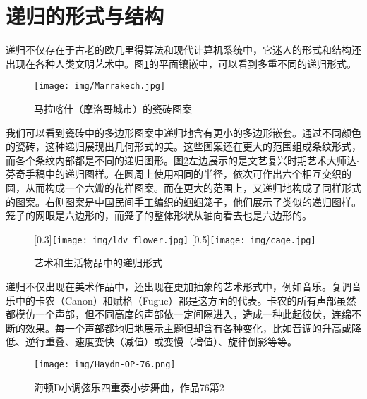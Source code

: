 \documentclass[UTF8]{article}
\begin{document}
\section{递归的形式与结构}

递归不仅存在于古老的欧几里得算法和现代计算机系统中，它迷人的形式和结构还出现在各种人类文明艺术中。图\ref{fig:Ceramic-Tile-Tessellations-Marrakech}的平面镶嵌中，可以看到多重不同的递归形式。

\begin{figure}[htbp]
 \centering
 \texttt{[image: img/Marrakech.jpg]}
 \caption{马拉喀什（摩洛哥城市）的瓷砖图案}
 \label{fig:Ceramic-Tile-Tessellations-Marrakech}
\end{figure}

我们可以看到瓷砖中的多边形图案中递归地含有更小的多边形嵌套。通过不同颜色的瓷砖，这种递归展现出几何形式的美。这些图案还在更大的范围组成条纹形式，而各个条纹内部都是不同的递归图形。图\ref{fig:flower}左边展示的是文艺复兴时期艺术大师达$\cdot$芬奇手稿中的递归图样。在圆周上使用相同的半径，依次可作出六个相互交织的圆，从而构成一个六瓣的花样图案。而在更大的范围上，又递归地构成了同样形式的图案。右侧图案是中国民间手工编织的蝈蝈笼子，他们展示了类似的递归图样。笼子的网眼是六边形的，而笼子的整体形状从轴向看去也是六边形的。

\begin{figure}[htbp]
 \centering
 [0.3\linewidth]{\texttt{[image: img/ldv\_flower.jpg]}} \quad
 [0.5\linewidth]{\texttt{[image: img/cage.jpg]}}
 \caption{艺术和生活物品中的递归形式}
 \label{fig:flower}
\end{figure}

递归不仅出现在美术作品中，还出现在更加抽象的艺术形式中，例如音乐。复调音乐中的卡农（Canon）和赋格（Fugue）都是这方面的代表。卡农的所有声部虽然都模仿一个声部，但不同高度的声部依一定间隔进入，造成一种此起彼伏，连绵不断的效果。每一个声部都地归地展示主题但却含有各种变化，比如音调的升高或降低、逆行重叠、速度变快（减值）或变慢（增值）、旋律倒影等等。

\begin{figure}[htbp]
 \centering
 \texttt{[image: img/Haydn-OP-76.png]}
 \caption{海顿D小调弦乐四重奏小步舞曲，作品76第2}
 \label{fig:Haydn-OP-76}
\end{figure}
\end{document}
